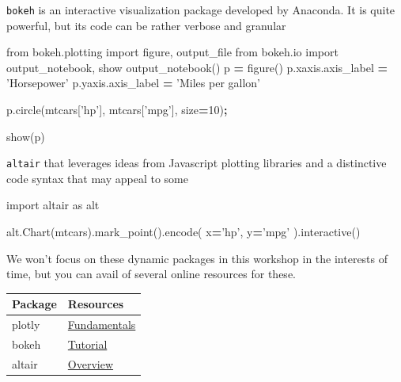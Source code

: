 \documentclass[
  letterpaper,
]{scrbook}
\newenvironment{Shaded}{\begin{snugshade}}{\end{snugshade}}
\newcommand{\DecValTok}[1]{\textcolor[rgb]{0.00,0.00,0.81}{#1}}
\newcommand{\ImportTok}[1]{#1}
\newcommand{\NormalTok}[1]{#1}
\newcommand{\OperatorTok}[1]{\textcolor[rgb]{0.81,0.36,0.00}{\textbf{#1}}}
\newcommand{\StringTok}[1]{\textcolor[rgb]{0.31,0.60,0.02}{#1}}
\begin{document}
\texttt{bokeh} is an interactive visualization package developed by Anaconda. It is quite powerful, but its code can be rather verbose and granular

\begin{Shaded}
\begin{Highlighting}[]
\ImportTok{from}\NormalTok{ bokeh.plotting }\ImportTok{import}\NormalTok{ figure, output_file}
\ImportTok{from}\NormalTok{ bokeh.io }\ImportTok{import}\NormalTok{ output_notebook, show}
\NormalTok{output_notebook()}
\NormalTok{p }\OperatorTok{=}\NormalTok{ figure()}
\NormalTok{p.xaxis.axis_label }\OperatorTok{=} \StringTok{'Horsepower'}
\NormalTok{p.yaxis.axis_label }\OperatorTok{=} \StringTok{'Miles per gallon'}

\NormalTok{p.circle(mtcars[}\StringTok{'hp'}\NormalTok{], mtcars[}\StringTok{'mpg'}\NormalTok{], size}\OperatorTok{=}\DecValTok{10}\NormalTok{)}\OperatorTok{;}

\NormalTok{show(p)}
\end{Highlighting}
\end{Shaded}

\texttt{altair} that leverages ideas from Javascript plotting libraries and a distinctive code syntax that may appeal to some

\begin{Shaded}
\begin{Highlighting}[]
\ImportTok{import}\NormalTok{ altair }\ImportTok{as}\NormalTok{ alt}

\NormalTok{alt.Chart(mtcars).mark_point().encode(}
\NormalTok{    x}\OperatorTok{=}\StringTok{'hp'}\NormalTok{,}
\NormalTok{    y}\OperatorTok{=}\StringTok{'mpg'}
\NormalTok{).interactive()}
\end{Highlighting}
\end{Shaded}

We won't focus on these dynamic packages in this workshop in the interests of time, but you can avail of several online resources for these.

\begin{longtable}[]{@{}ll@{}}
\toprule
Package & Resources\tabularnewline
\midrule
\endhead
plotly & \href{https://plotly.com/python/}{Fundamentals}\tabularnewline
bokeh & \href{https://mybinder.org/v2/gh/bokeh/bokeh-notebooks/master?filepath=tutorial\%2F00\%20-\%20Introduction\%20and\%20Setup.ipynb}{Tutorial}\tabularnewline
altair & \href{https://altair-viz.github.io/getting_started/overview.html}{Overview}\tabularnewline
\bottomrule
\end{longtable}
\end{document}
